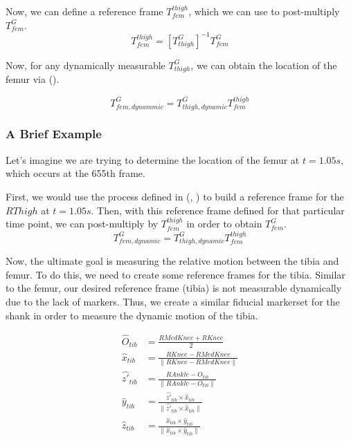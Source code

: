 \documentclass[10pt]{IEEEtran}
\begin{document}
    Now, we can define a reference frame $T^{thigh}_{fem}$, which we can use to post-multiply $T^{G}_{fem}$. 
    \begin{equation}
        T^{thigh}_{fem} = [T^{G}_{thigh}]^{-1}T^{G}_{fem}
    \end{equation}

    Now, for any dynamically measurable $T^{G}_{thigh}$, we can obtain the location of the femur via ().

    \begin{equation}
        T^{G}_{fem,dynammic} = T^{G}_{thigh,dynamic}T^{thigh}_{fem}
        \label{t_th_g_f}
    \end{equation}

    \begin{mdframed}
        \subsubsection*{A Brief Example}
        Let's imagine we are trying to determine the location of the femur at $t=1.05s$, which occurs at the 655th frame. 
        
        First, we would use the process defined in (, ) to build a reference frame for the $RThigh$ at $t = 1.05s$. Then, with this reference frame defined for that particular time point, we can post-multiply by $T^{thigh}_{fem}$ in order to obtain $T^{G}_{fem}$.
        \begin{equation}
            T^{G}_{fem,dynamic} = T^{G}_{thigh,dynamic}T^{thigh}_{fem}
        \end{equation}
    \end{mdframed}

    Now, the ultimate goal is measuring the relative motion between the tibia and femur. To do this, we need to create some reference frames for the tibia. Similar to the femur, our desired reference frame (tibia) is not measurable dynamically due to the lack of markers. Thus, we create a similar fiducial markerset for the shank in order to measure the dynamic motion of the tibia.

    \begin{equation}
        \begin{aligned}
            \hat{O}_{tib} &= \frac{RMedKnee + RKnee}{2}\\
            \hat{x}_{tib} & = \frac{RKnee - RMedKnee}{\|RKnee - RMedKnee\|} \\
            \hat{z'}_{tib} &= \frac{RAnkle - O_{tib}}{\|RAnkle - O_{tib}\|} \\
            \hat{y}_{tib} &= \frac{\hat{z'}_{tib} \times \hat{x}_{tib}}{\|\hat{z'}_{tib} \times \hat{x}_{tib}\|} \\
            \hat{z}_{tib} & = \frac{\hat{x}_{tib} \times \hat{y}_{tib}}{\|\hat{x}_{tib} \times \hat{y}_{tib}\|}
        \end{aligned}
        \label{tib_rf}
    \end{equation}
\end{document}

